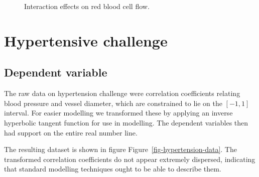 \documentclass[
  letterpaper,
  DIV=11,
  numbers=noendperiod,
  oneside]{scrartcl}
\theoremstyle{plain}
\theoremstyle{remark}
\begin{document}
\begin{figure}


\caption{\label{fig-flow-interaction}Interaction effects on red blood
cell flow.}

\end{figure}%

\section{Hypertensive challenge}\label{hypertensive-challenge-1}

\subsection{Dependent variable}\label{dependent-variable-3}

The raw data on hypertension challenge were correlation coefficients
relating blood pressure and vessel diameter, which are constrained to
lie on the \([-1,
1]\) interval. For easier modelling we transformed these by applying an
inverse hyperbolic tangent function for use in modelling. The dependent
variables then had support on the entire real number line.

The resulting dataset is shown in figure
Figure~\ref{fig-hypertension-data}. The transformed correlation
coefficients do not appear extremely dispersed, indicating that standard
modelling techniques ought to be able to describe them.
\end{document}
